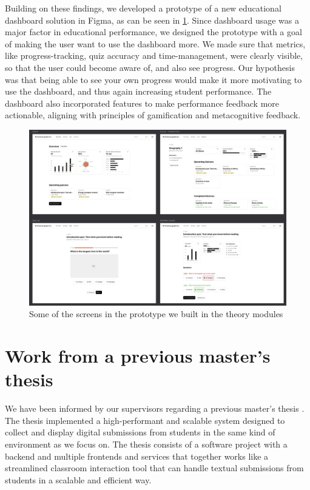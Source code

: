 Building on these findings, we developed a prototype of a new educational dashboard solution in Figma, as can be seen in \ref{fig:previous-work-theory-modules-prototype}. Since dashboard usage was a major factor in educational performance, we designed the prototype with a goal of making the user want to use the dashboard more. We made sure that metrics, like progress-tracking, quiz accuracy and time-management, were clearly visible, so that the user could become aware of, and also see progress. Our hypothesis was that being able to see your own progress would make it more motivating to use the dashboard, and thus again increasing student performance. The dashboard also incorporated features to make performance feedback more actionable, aligning with principles of gamification and metacognitive feedback.

\begin{figure}[h!]
    \centering
    \includegraphics[width=1\linewidth]{figures//c5/previous-work.png}
    \caption{Some of the screens in the prototype we built in the theory modules \cite{theoryModule3}}
    \label{fig:previous-work-theory-modules-prototype}
\end{figure}

\section{Work from a previous master's thesis}
We have been informed by our supervisors regarding a previous master's thesis \cite{Olsen2024}. The thesis implemented a high-performant and scalable system designed to collect and display digital submissions from students in the same kind of environment as we focus on. The thesis consists of a software project with a backend and multiple frontends and services that together works like a streamlined classroom interaction tool that can handle textual submissions from students in a scalable and efficient way.

